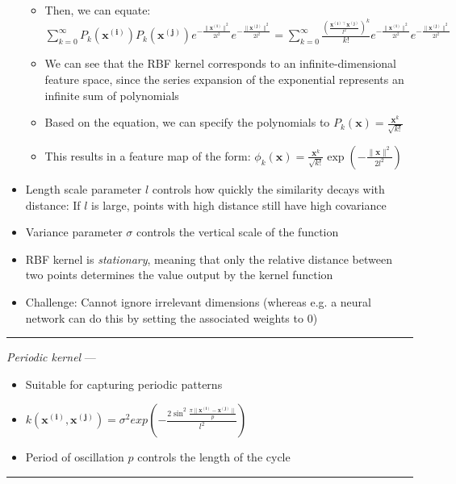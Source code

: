 \begin{itemize}
\begin{itemize}
        \item Then, we can equate:
        $ \sum_{k=0}^\infty P_k(\boldsymbol{x^{(i)}}) P_k(\boldsymbol{x^{(j)}}) e^{-\frac{\|\boldsymbol{x^{(i)}}\|^2}{2l^2}} e^{-\frac{\|\boldsymbol{x^{(j)}}\|^2}{2l^2}} = \sum_{k=0}^\infty \frac{(\frac{\boldsymbol{x^{(i)\intercal}} \boldsymbol{x^{(j)}}}{l^2})^k}{k!} e^{-\frac{\|\boldsymbol{x^{(i)}}\|^2}{2l^2}} e^{-\frac{\|\boldsymbol{x^{(j)}}\|^2}{2l^2}} $
        \item We can see that the RBF kernel corresponds to an infinite-dimensional feature space, since the series expansion of the exponential represents an infinite sum of polynomials 
        \item Based on the equation, we can specify the polynomials to $ P_k(\boldsymbol{x}) = \frac{\boldsymbol{x}^k}{\sqrt{k!}} $
        \item This results in a feature map of the form:
        $ \phi_k(\boldsymbol{x}) = \frac{\boldsymbol{x}^k}{\sqrt{k!}} \exp(-\frac{\|\boldsymbol{x}\|^2}{2l^2}) $
    \end{itemize}
    \item Length scale parameter $l$ controls how quickly the similarity decays with distance: If $l$ is large, points with high distance still have high covariance
    \item Variance parameter $\sigma$ controls the vertical scale of the function
    \item RBF kernel is \emph{stationary}, meaning that only the relative distance between two points determines the value output by the kernel function
    \item Challenge: Cannot ignore irrelevant dimensions (whereas e.g. a neural network can do this by setting the associated weights to $0$)
\end{itemize}

{\color{lightgray}\hrule height 0.001mm}

\emph{Periodic kernel} ---
\begin{itemize}
    \item Suitable for capturing periodic patterns
    \item $k( \boldsymbol{x^{(i)}}, \boldsymbol{x^{(j)}} ) = \sigma^2 exp (- \frac{ 2 \sin^2 \frac{ \pi \| \boldsymbol{x^{(i)}} - \boldsymbol{x^{(j)}} \|}{p} }{ l^2 } )$
    \item Period of oscillation $p$ controls the length of the cycle
\end{itemize}

{\color{lightgray}\hrule height 0.001mm}

